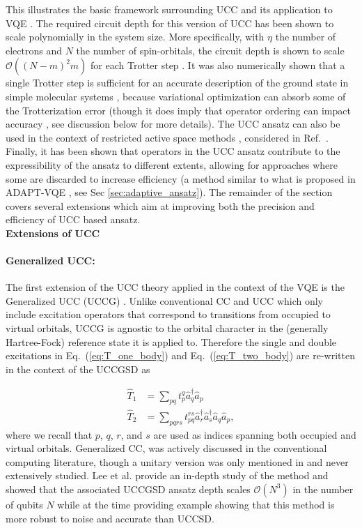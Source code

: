 This illustrates the basic framework surrounding UCC and its application to VQE \cite{Peruzzo2014, Wecker2015, Romero2019}. The required circuit depth for this version of UCC has been shown to scale polynomially in the system size. More specifically, with $\eta$ the number of electrons and $N$ the number of spin-orbitals, the circuit depth is shown to scale $\mathcal{O}((N - m)^2m)$ for each Trotter step \cite{Lee2019}. It was also numerically shown that a single Trotter step is sufficient for an accurate description of the ground state in simple molecular systems \cite{Barkoutsos2018}, because variational optimization can absorb some of the Trotterization error \cite{OMalley2016, Romero2019} (though it does imply that operator ordering can impact accuracy \cite{Grimsley2019_UCC_Review}, see discussion below for more details). 
The UCC ansatz can also be used in the context of restricted active space methods \cite{Roos1980}, considered in Ref.~\cite{Romero2019}. Finally, it has been shown that operators in the UCC ansatz contribute to the expressibility of the ansatz to different extents, allowing for approaches where some are discarded to increase efficiency \cite{Zhang2021_shallow} (a method similar to what is proposed in ADAPT-VQE \cite{Grimsley2019}, see Sec \ref{sec:adaptive_ansatz}). The remainder of the section covers several extensions which aim at improving both the precision and efficiency of UCC based ansatz.\\

\textbf{Extensions of UCC} \\

\paragraph{Generalized UCC:} The first extension of the UCC theory applied in the context of the VQE is the Generalized UCC (UCCG) \cite{Lee2019}. Unlike conventional CC and UCC which only include excitation operators that correspond to transitions from occupied to virtual orbitals, UCCG is agnostic to the orbital character in the (generally Hartree-Fock) reference state it is applied to. Therefore the single and double excitations in Eq.~(\ref{eq:T_one_body}) and Eq.~(\ref{eq:T_two_body}) are re-written in the context of the UCCGSD \cite{Lee2019} as

\begin{align}
\hat{T}_1 &= \sum_{pq} t_{p}^q\hat{a}^{\dagger}_q \hat{a}_p \label{eq:T_one_body_G} \\
\hat{T}_2 &= \sum_{pqrs} t_{pq}^{rs}\hat{a}^{\dagger}_r \hat{a}^{\dagger}_s \hat{a}_q \hat{a}_p, \label{eq:T_two_body_G}
\end{align}
where we recall that $p$, $q$, $r$, and $s$ are used as indices spanning both occupied and virtual orbitals. Generalized CC, was actively discussed in the conventional computing literature, though a unitary version was only mentioned in \cite{Nooijen2000} and never extensively studied. Lee et al. \cite{Lee2019} provide an in-depth study of the method and showed that the associated UCCGSD ansatz depth scales $\mathcal{O}(N^3)$ in the number of qubits $N$ while at the time providing example showing that this method is more robust to noise and accurate than UCCSD.

